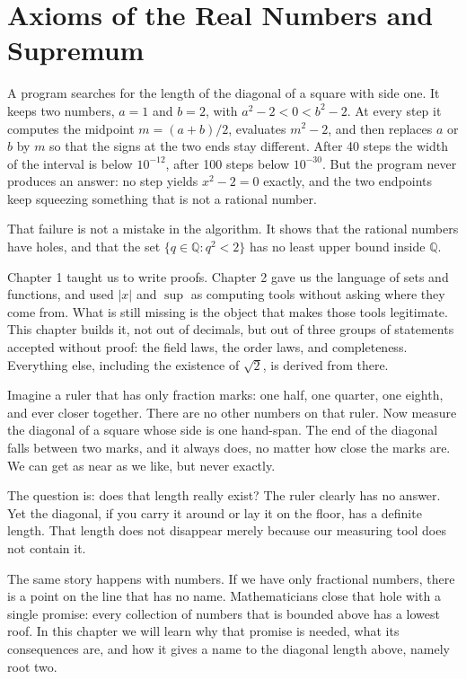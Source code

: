\chapter{Axioms of the Real Numbers and Supremum}

A program searches for the length of the diagonal of a square with side one. It keeps
two numbers, $a=1$ and $b=2$, with $a^2-2<0<b^2-2$. At every step it computes the
midpoint $m=(a+b)/2$, evaluates $m^2-2$, and then replaces $a$ or $b$ by $m$ so that
the signs at the two ends stay different. After 40 steps the width of the interval is
below $10^{-12}$, after 100 steps below $10^{-30}$. But the program never produces an
answer: no step yields $x^2-2=0$ exactly, and the two endpoints keep squeezing
something that is not a rational number.

That failure is not a mistake in the algorithm. It shows that the rational numbers
have holes, and that the set $\{q\in\mathbb{Q}: q^2<2\}$ has no least upper bound
inside $\mathbb{Q}$.

Chapter 1 taught us to write proofs. Chapter 2 gave us the language of sets and
functions, and used $|x|$ and $\sup$ as computing tools without asking where they come
from. What is still missing is the object that makes those tools legitimate. This
chapter builds it, not out of decimals, but out of three groups of statements accepted
without proof: the field laws, the order laws, and completeness. Everything else,
including the existence of $\sqrt{2}$, is derived from there.

\begin{untukanak}
Imagine a ruler that has only fraction marks: one half, one quarter, one eighth, and
ever closer together. There are no other numbers on that ruler. Now measure the
diagonal of a square whose side is one hand-span. The end of the diagonal falls
between two marks, and it always does, no matter how close the marks are. We can get
as near as we like, but never exactly.

The question is: does that length really exist? The ruler clearly has no answer. Yet
the diagonal, if you carry it around or lay it on the floor, has a definite length.
That length does not disappear merely because our measuring tool does not contain it.

The same story happens with numbers. If we have only fractional numbers, there is a
point on the line that has no name. Mathematicians close that hole with a single
promise: every collection of numbers that is bounded above has a lowest roof. In this
chapter we will learn why that promise is needed, what its consequences are, and how
it gives a name to the diagonal length above, namely root two.
\end{untukanak}

